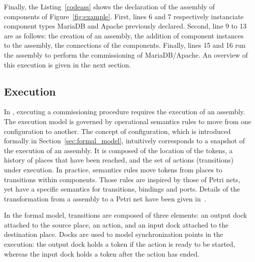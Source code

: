 

Finally, the Listing~\ref{codeass} shows the declaration of the
assembly of components of Figure~\ref{fig:example}. First, lines 6 and
7 respectively instanciate component types MariaDB and Apache
previously declared. Second, line 9 to 13 are as follows: the creation
of an assembly, the addition of component instances to the assembly,
the connections of the components. Finally, lines 15 and 16 run the
assembly to perform the commissioning of MariaDB/Apache. An overview
of this execution is given in the next section.



\subsection{Execution}

In \mad, executing a commissioning procedure requires the execution of
an assembly. The \mad execution model is governed by operational
semantics rules to move from one configuration to another. The concept
of configuration, which is introduced formally in
Section~\ref{sec:formal_model}, intuitively corresponds to a snapshot
of the execution of an assembly. It is composed of the location of the
tokens, a history of places that have been reached, and the set of
actions (transitions) under execution. In practice, semantics rules
move tokens from places to transitions within components. Those rules
are inspired by those of Petri nets, yet have a specific semantics for
transitions, bindings and ports. Details of the transformation from a
\mad assembly to a Petri net have been given
in~\cite{coullon:hal-02323641}.

%
In the formal model, transitions are composed of three elements: an
output dock attached to the source place, an action, and an input dock
attached to the destination place. Docks are used to model
synchronization points in the execution: the output dock holds a token
if the action is ready to be started, whereas the input dock holds a
token after the action has ended.

